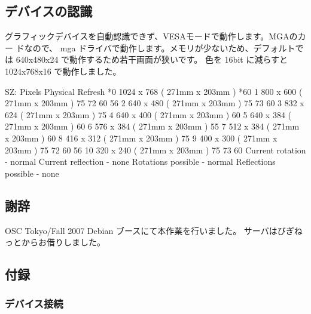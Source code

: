 \documentclass[mingoth,a4paper]{jsarticle}
\begin{document}
\subsection{デバイスの認識}

グラフィックデバイスを自動認識できず、VESAモードで動作します。MGAのカー
ドなので、 mga ドライバで動作します。メモリが少ないため、デフォルトでは 
640x480x24 で動作するため若干画面が狭いです。 色を 16bit に減らすと 
1024x768x16 で動作しました。

\begin{commandline}
 SZ:    Pixels          Physical       Refresh
*0   1024 x 768    ( 271mm x 203mm )  *60  
 1    800 x 600    ( 271mm x 203mm )   75   72   60   56  
 2    640 x 480    ( 271mm x 203mm )   75   73   60  
 3    832 x 624    ( 271mm x 203mm )   75  
 4    640 x 400    ( 271mm x 203mm )   60  
 5    640 x 384    ( 271mm x 203mm )   60  
 6    576 x 384    ( 271mm x 203mm )   55  
 7    512 x 384    ( 271mm x 203mm )   60  
 8    416 x 312    ( 271mm x 203mm )   75  
 9    400 x 300    ( 271mm x 203mm )   75   72   60   56  
 10   320 x 240    ( 271mm x 203mm )   75   73   60  
Current rotation - normal
Current reflection - none
Rotations possible - normal 
Reflections possible - none
\end{commandline}

\subsection{謝辞}

OSC Tokyo/Fall 2007 Debian ブースにて本作業を行いました。
サーバはびぎねっとからお借りしました。

\subsection{付録}

\subsubsection{デバイス接続}
\end{document}
